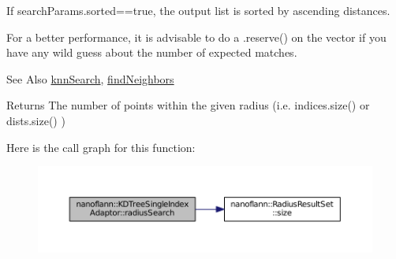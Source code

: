 If search\-Params.\-sorted==true, the output list is sorted by ascending distances.

For a better performance, it is advisable to do a .reserve() on the vector if you have any wild guess about the number of expected matches.

\begin{DoxySeeAlso}{See Also}
\hyperlink{classnanoflann_1_1_k_d_tree_single_index_adaptor_acf404828507288cf6302ced33bdc45bb}{knn\-Search}, \hyperlink{classnanoflann_1_1_k_d_tree_single_index_adaptor_a1b73cef78437060cec2629810608d63e}{find\-Neighbors} 
\end{DoxySeeAlso}
\begin{DoxyReturn}{Returns}
The number of points within the given radius (i.\-e. indices.\-size() or dists.\-size() ) 
\end{DoxyReturn}


Here is the call graph for this function\-:\nopagebreak
\begin{figure}[H]
\begin{center}
\leavevmode
\includegraphics[width=350pt]{classnanoflann_1_1_k_d_tree_single_index_adaptor_afcaab7169b54103fcb37c6ad02ec44f7_cgraph}
\end{center}
\end{figure}



